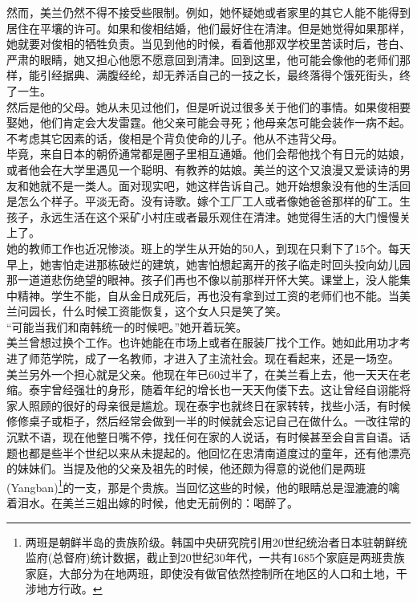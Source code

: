然而，美兰仍然不得不接受些限制。例如，她怀疑她或者家里的其它人能不能得到居住在平壤的许可。如果和俊相结婚，他们最好住在清津。但是她觉得如果那样，她就要对俊相的牺牲负责。当见到他的时候，看着他那双学校里苦读时后，苍白、严肃的眼睛，她又担心他愿不愿意回到清津。回到这里，他可能会像他的老师们那样，能引经据典、满腹经纶，却无养活自己的一技之长，最终落得个饿死街头，终了一生。\\

然后是他的父母。她从未见过他们，但是听说过很多关于他们的事情。如果俊相要娶她，他们肯定会大发雷霆。他父亲可能会寻死；他母亲怎可能会装作一病不起。不考虑其它因素的话，俊相是个背负使命的儿子。他从不违背父母。\\

毕竟，来自日本的朝侨通常都是圈子里相互通婚。他们会帮他找个有日元的姑娘，或者他会在大学里遇见一个聪明、有教养的姑娘。美兰的这个又浪漫又爱读诗的男友和她就不是一类人。面对现实吧，她这样告诉自己。她开始想象没有他的生活回是怎么个样子。平淡无奇。没有诗歌。嫁个工厂工人或者像她爸爸那样的矿工。生孩子，永远生活在这个采矿小村庄或者最乐观住在清津。她觉得生活的大门慢慢关上了。\\

她的教师工作也近况惨淡。班上的学生从开始的50人，到现在只剩下了15个。每天早上，她害怕走进那栋破烂的建筑，她害怕想起离开的孩子临走时回头投向幼儿园那一道道悲伤绝望的眼神。孩子们再也不像以前那样开怀大笑。课堂上，没人能集中精神。学生不能，自从金日成死后，再也没有拿到过工资的老师们也不能。当美兰问园长，什么时候工资能恢复，这个女人只是笑了笑。\\

“可能当我们和南韩统一的时候吧。”她开着玩笑。\\

美兰曾想过换个工作。也许她能在市场上或者在服装厂找个工作。她如此用功才考进了师范学院，成了一名教师，才进入了主流社会。现在看起来，还是一场空。\\

美兰另外一个担心就是父亲。他现在年已60过半了，在美兰看上去，他一天天在老缩。泰宇曾经强壮的身形，随着年纪的增长也一天天佝偻下去。这让曾经自诩能将家人照顾的很好的母亲很是尴尬。现在泰宇也就终日在家转转，找些小活，有时候修修桌子或柜子，然后经常会做到一半的时候就会忘记自己在做什么。一改往常的沉默不语，现在他整日嘴不停，找任何在家的人说话，有时候甚至会自言自语。话题也都是些半个世纪以来从未提起的。他回忆在忠清南道度过的童年，还有他漂亮的妹妹们。当提及他的父亲及祖先的时候，他还颇为得意的说他们是两班(Yangban)\footnote{两班是朝鲜半岛的贵族阶级。韩国中央研究院引用20世纪统治者日本驻朝鲜统监府(总督府)统计数据，截止到20世纪30年代，一共有1685个家庭是两班贵族家庭，大部分为在地两班，即使没有做官依然控制所在地区的人口和土地，干涉地方行政。}的一支，那是个贵族。当回忆这些的时候，他的眼睛总是湿漉漉的噙着泪水。在美兰三姐出嫁的时候，他史无前例的：喝醉了。\\

